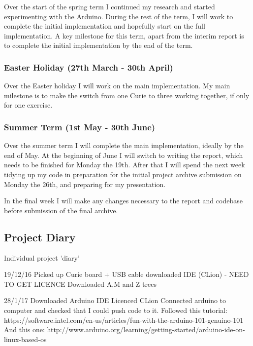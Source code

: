\documentclass[a4paper]{article}
\begin{document}
Over the start of the spring term I continued my research and started experimenting with the Arduino. During the rest of the term, I will work to complete the initial implementation and hopefully start on the full implementation. A key milestone for this term, apart from the interim report is to complete the initial implementation by the end of the term.

\subsubsection{Easter Holiday (27th March - 30th April)}

Over the Easter holiday I will work on the main implementation. My main milestone is to make the switch from one Curie to three working together, if only for one exercise. 

\subsubsection{Summer Term (1st May - 30th June)}

Over the summer term I will complete the main implementation, ideally by the end of May. At the beginning of June I will switch to writing the report, which needs to be finished for Monday the 19th. After that I will spend the next week tidying up my code in preparation for the initial project archive submission on Monday the 26th, and preparing for my presentation. 

In the final week I will make any changes necessary to the report and codebase before submission of the final archive. 

\subsection{Project Diary}%
\label{subsec:a3_pd}

Individual project 'diary'

19/12/16
    Picked up Curie board + USB cable
    downloaded IDE (CLion) - NEED TO GET LICENCE
    Downloaded A,M and Z trees

28/1/17
    Downloaded Arduino IDE
    Licenced CLion
    Connected arduino to computer and checked that I could push code to it.
        Followed this tutorial: https://software.intel.com/en-us/articles/fun-with-the-arduino-101-genuino-101
        And this one: http://www.arduino.org/learning/getting-started/arduino-ide-on-linux-based-os
\end{document}
